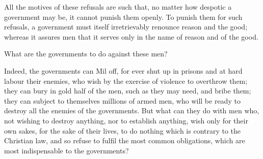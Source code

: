 \documentclass{book}
\begin{document}
All the motives of these refusals are such that, no matter how despotic a government may be, it cannot punish them openly. To punish them for such refusals, a government must itself irretrievably renounce reason and the good; whereas it assures men that it serves only in the name of reason and of the good.

What are the governments to do against these men?

Indeed, the governments can Mil off, for ever shut up in prisons and at hard labour their enemies, who wish by the exercise of violence to overthrow them; they can bury in gold half of the men, such as they may need, and bribe them; they can subject to themselves millions of armed men, who will be ready to destroy all the enemies of the governments. But what can they do with men who, not wishing to destroy anything, nor to establish anything, wish only for their own sakes, for the sake of their lives, to do nothing which is contrary to the Christian law, and so refuse to fulfil the most common obligations, which are most indispensable to the governments?
\end{document}
